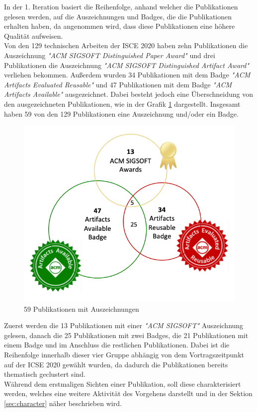 In der 1. Iteration basiert die Reihenfolge, anhand welcher die Publikationen gelesen werden, auf die Auszeichnungen und Badges, die die Publikationen erhalten haben, da angenommen wird, dass diese Publikationen eine höhere Qualität aufweisen. \\
Von den 129 technischen Arbeiten der ISCE 2020 haben zehn Publikationen die Auszeichnung \textit{"ACM SIGSOFT Distinguished Paper Award"} und drei Publikationen die Auszeichnung \textit{"ACM SIGSOFT Distinguished Artifact Award"} verliehen bekommen.
Außerdem wurden 34 Publikationen mit dem Badge \textit{"ACM Artifacts Evaluated Reusable"} und 47 Publikationen mit dem Badge \textit{"ACM Artifacts Available"} ausgezeichnet.
Dabei besteht jedoch eine Überschneidung von den ausgezeichneten Publikationen, wie in der Grafik \ref{img:awards} dargestellt.
Insgesamt haben 59 von den 129 Publikationen eine Auszeichnung und/oder ein Badge. \\

\begin{figure}[thb]
    \centering
    \includegraphics[clip,width=0.6\linewidth]{content/images/03-Awards}
    \caption{59 Publikationen mit Auszeichnungen}
    \label{img:awards}
\end{figure}

Zuerst werden die 13 Publikationen mit einer \textit{"ACM SIGSOFT"} Auszeichnung gelesen, danach die 25 Publikationen mit zwei Badges, die 21 Publikationen mit einem Badge und im Anschluss die restlichen Publikationen. Dabei ist die Reihenfolge innerhalb dieser vier Gruppe
abhängig von dem Vortragszeitpunkt auf der ICSE 2020 gewählt wurden, da dadurch die Publikationen bereits thematisch geclustert sind. \\

Während dem erstmaligen Sichten einer Publikation, soll diese charakterisiert werden, welches eine weitere Aktivität des Vorgehens darstellt und in der Sektion \ref{sec:character} näher beschrieben wird.\\

